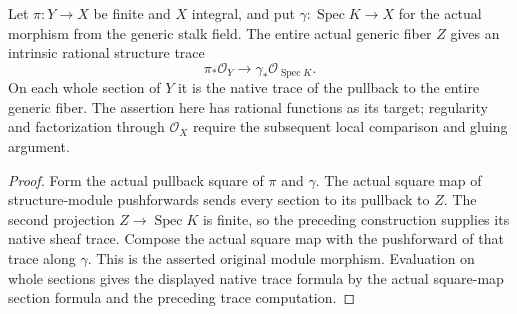 \begin{definition}
\label{def:kn-structure-trace-rational}
\leanok
Let $\pi:Y\to X$ be finite and $X$ integral, and put
$\gamma:\operatorname{Spec}K\to X$ for the actual morphism from the
generic stalk field. The entire actual generic fiber $Z$ gives an
intrinsic rational structure trace
\[
 \pi_*\mathcal O_Y\longrightarrow\gamma_*\mathcal O_{\operatorname{Spec}K}.
\]
On each whole section of $Y$ it is the native trace of the pullback to
the entire generic fiber. The assertion here has rational functions
as its target; regularity and factorization through $\mathcal O_X$
require the subsequent local comparison and gluing argument.
\end{definition}
\begin{proof}
Form the actual pullback square of $\pi$ and $\gamma$. The actual square
map of structure-module pushforwards sends every section to its
pullback to $Z$. The second projection $Z\to\operatorname{Spec}K$ is
finite, so the preceding construction supplies its native sheaf trace.
Compose the actual square map with the pushforward of that trace along
$\gamma$. This is the asserted original module morphism. Evaluation
on whole sections gives the displayed native trace formula by the
actual square-map section formula and the preceding trace computation.
\end{proof}
